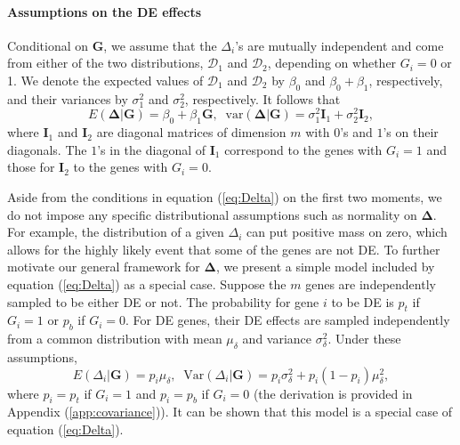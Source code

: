 	\paragraph{Assumptions on the DE effects}\label{subsection:DeltaModel}
	Conditional on $\bm G$, we assume that the $\Delta_i$'s are mutually independent and come from
	either of the two distributions, $\mathscr{D}_1$ and $\mathscr{D}_2$, depending on whether 
	$G_i=0$
	or 1. We denote the expected values of $\mathscr{D}_1$ and $\mathscr{D}_2$ by $\beta_0$ and
	$\beta_0+\beta_1$, respectively, and their variances by $\sigma_1^2$ and $\sigma_2^2$, 
	respectively.
	It follows that 
	\begin{equation}
	\label{eq:Delta}
	E(\bm \Delta|\bm G)=\beta_0 + \beta_1 \bm G,\;\; \mbox{var}(\bm \Delta|\bm G) = \sigma_1^2\bm
	I_1+\sigma_2^2\bm I_2,
	\end{equation} 
	where $\bm I_1$ and $\bm I_2$ are diagonal matrices of dimension $m$ with $0$'s and $1$'s on 
	their
	diagonals. The $1$'s in the diagonal of $\bm I_1$ correspond to the genes with $G_i=1$ and 
	those for
	$\bm I_2$ to the genes with $G_i=0$.
	
	Aside from the conditions in equation (\ref{eq:Delta}) on the first two moments, we do not 
	impose
	any specific distributional assumptions such as normality on $\bm \Delta$. For example, the
	distribution of a given $\Delta_i$ can put positive mass on zero, which allows for the highly 
	likely
	event that some of the genes are not DE. To further motivate our general framework for $\bm 
	\Delta$,
	we present a simple model included by equation (\ref{eq:Delta}) as a special case. Suppose the 
	$m$
	genes are independently sampled to be either DE or not. The probability for gene $i$ to be DE is
	$p_t$ if $G_i=1$ or $p_b$ if $G_i=0$. For DE genes, their DE effects are sampled independently 
	from
	a common distribution with mean $\mu_\delta$ and variance $\sigma^2_\delta$. Under these
	assumptions, 
	\begin{equation}
	\label{eq:DeltaBinom}
	E(\Delta_i|\bm G) = p_i\mu_{\delta},\;\; \text{Var}(\Delta_i|\bm G)= p_i\sigma_{\delta}^2 +
	p_i(1-p_i)\mu_{\delta}^2,
	\end{equation}
	where $p_i=p_{t}$ if $G_i=1$ and $p_i=p_{b}$ if $G_i=0$ (the derivation is provided in Appendix 
	(\ref{app:covariance})). It can be shown that this model is a
	special case of equation (\ref{eq:Delta}).
	

